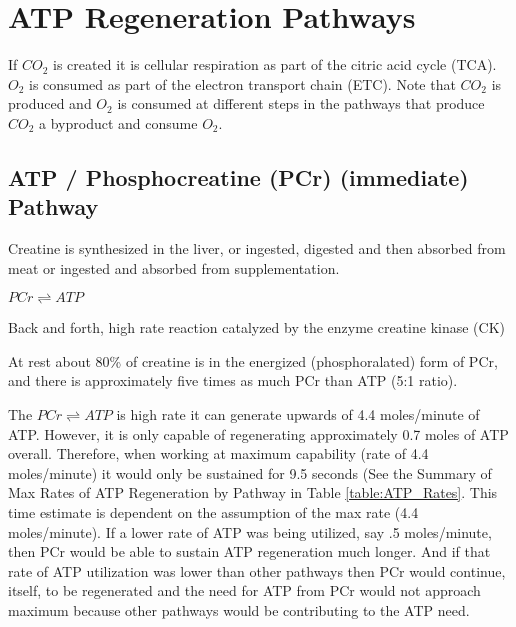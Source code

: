 

\section{ATP Regeneration Pathways}

If $CO_2$ is created it is cellular respiration as part of the citric acid cycle (TCA). $O_2$ is consumed as part of the electron transport chain (ETC). Note that $CO_2$ is produced and $O_2$ is consumed at different steps in the pathways that produce $CO_2$ a byproduct and consume $O_2$.

\subsection{ATP / Phosphocreatine (PCr) (immediate) Pathway}


Creatine is synthesized in the liver, or ingested, digested and then absorbed from meat or ingested and absorbed from supplementation.\footnotemark{}

$PCr \rightleftharpoons ATP$

Back and forth, high rate reaction catalyzed by the enzyme creatine kinase (CK)

At rest about 80\% of creatine is in the energized (phosphoralated) form of PCr, and there is approximately five times as much PCr than ATP (5:1 ratio).

The $PCr \rightleftharpoons ATP$ is high rate it can generate upwards of 4.4 moles/minute of ATP. However, it is only capable of regenerating approximately 0.7 moles of ATP overall. Therefore, when working at maximum capability (rate of 4.4 moles/minute) it would only be sustained for 9.5 seconds (See the Summary of Max Rates of ATP Regeneration by Pathway in Table \ref{table:ATP_Rates}. This time estimate is dependent on the assumption of the max rate (4.4 moles/minute). If a lower rate of ATP was being utilized, say .5 moles/minute, then PCr would be able to sustain ATP regeneration much longer. And if that rate of ATP utilization was lower than other pathways then PCr would continue, itself, to be regenerated and the need for ATP from PCr would not approach maximum because other pathways would be contributing to the ATP need.


